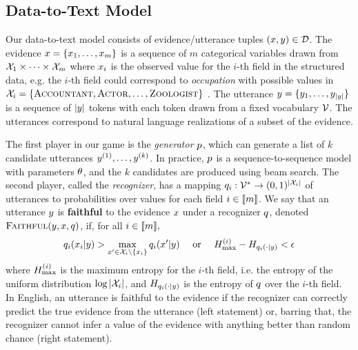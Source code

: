   \subsection{Data-to-Text Model}
  \label{sec:struct_data_model}

  Our data-to-text model consists of evidence/utterance tuples $(x, y)\in
  \mathcal{D}$.
   The evidence $x = \{x_1, \ldots, x_m\}$
   is a sequence of $m$ categorical variables drawn from  
   $\mathcal{X}_1 \times \cdots \times \mathcal{X}_{m}$ where $x_i$ is the observed value for the 
   $i$-th field in the structured data, e.g. the $i$-th field could correspond 
   to \textit{occupation} with possible values
   in $\mathcal{X}_i = 
   \{ \textsc{Accountant}, \textsc{Actor},
    \ldots, \textsc{Zoologist} \}$ .
The utterance $y = \{y_1,\ldots, 
y_{|y|}\}$ is a 
  sequence of $|y|$ tokens with each token drawn from a fixed 
  vocabulary $\mathcal{V}$. The utterances correspond to natural language 
  realizations of a subset
  of the evidence.

  The first player in our game is the \textit{generator} $p$, which can 
  generate a list of $k$ candidate utterances $y^{(1)},\ldots,
  y^{(k)}$. In practice, $p$ is a sequence-to-sequence 
  model \citep{bahdanau2014neural} with parameters $\theta$, and the $k$ 
candidates are produced using beam search.
 The second player, called the \textit{recognizer}, has a mapping
 $q_i : \mathcal{V}^* \rightarrow (0,1)^{|\mathcal{X}_i|}$ of utterances to
 probabilities over values for each field
 $i \in \llbracket m \rrbracket$. We say that an utterance $y$ is \textbf{faithful}
 to the evidence $x$ under a recognizer $q$, 
denoted $\textsc{Faithful}(y,x,q)$, if, for all $i\in \llbracket m \rrbracket,$
\[ q_i(x_i|y) >
 \max_{x^\prime \in \mathcal{X}_i \setminus \{x_i\}}
  q_i(x^\prime|y) 
  \quad \textrm{ or } \quad  
  H^{(i)}_{\max} - H_{q_i(\cdot|y)} < \epsilon\]
where $H^{(i)}_{\max}$ is the maximum entropy for the $i$-th field,
i.e. the entropy of the uniform distribution 
$\log |\mathcal{X}_i|$, and $H_{q_i(\cdot|y)}$ 
is the entropy of $q$ over the $i$-th field. In English, 
an utterance is faithful to the evidence if the recognizer can correctly
predict the true evidence from the utterance (left statement) or, barring that,
the recognizer cannot infer a value of the evidence with
anything better than random chance (right statement).


